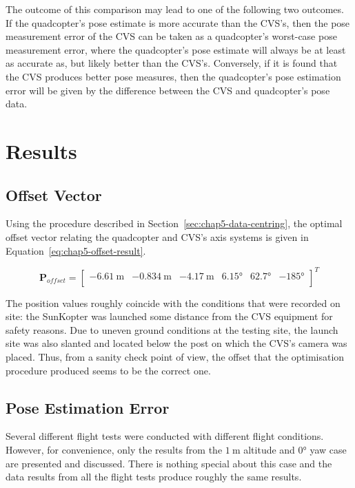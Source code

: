 The outcome of this comparison may lead to one of the following two outcomes. If the quadcopter's pose estimate is more accurate than the CVS's, then the pose measurement error of the CVS can be taken as a quadcopter's worst-case pose measurement error, where the quadcopter's pose estimate will always be at least as accurate as, but likely better than the CVS's. Conversely, if it is found that the CVS produces better pose measures, then the quadcopter's pose estimation error will be given by the difference between the CVS and quadcopter's pose data. 

\section{Results}

\subsection{Offset Vector}

Using the procedure described in Section~\ref{sec:chap5-data-centring}, the optimal offset vector relating the quadcopter and CVS's axis systems is given in Equation~\ref{eq:chap5-offset-result}. 

\begin{equation}
  \label{eq:chap5-offset-result}
  \bm{P}_{of\!fset} = 
  \begin{bmatrix}
    \SI{-6.61}{\m} & \SI{-0.834}{\m} & \SI{-4.17}{\m} & \ang{6.15} & \ang{62.7} & \ang{-185} \\
  \end{bmatrix}^T
\end{equation}

The position values roughly coincide with the conditions that were recorded on site: the SunKopter was launched some distance from the CVS equipment for safety reasons. Due to uneven ground conditions at the testing site, the launch site was also slanted and located below the post on which the CVS's camera was placed. Thus, from a sanity check point of view, the offset that the optimisation procedure produced seems to be the correct one. 

\subsection{Pose Estimation Error}

Several different flight tests were conducted with different flight conditions. However, for convenience, only the results from the $\SI{1}{\m}$ altitude and $\ang{0}$ yaw case are presented and discussed. There is nothing special about this case and the data results from all the flight tests produce roughly the same results.  

